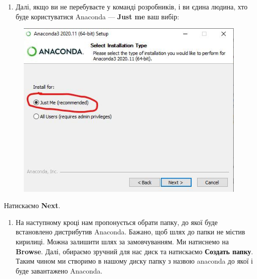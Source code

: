 \documentclass[
  letterpaper,
]{report}
\providecommand{\tightlist}{%
  \setlength{\itemsep}{0pt}\setlength{\parskip}{0pt}}\usepackage{longtable,booktabs,array}
\begin{document}
\begin{enumerate}
\def\labelenumi{\arabic{enumi}.}
\setcounter{enumi}{6}
\tightlist
\item
  Далі, якщо ви не перебуваєте у команді розробників, і ви єдина людина,
  хто буде користуватися Anaconda --- \textbf{Just me} ваш вибір:
\end{enumerate}

\begin{figure}

{\centering \includegraphics{Images/ap1/Screenshot_8.jpg}

}

\end{figure}

Натискаємо \textbf{Next}.

\begin{enumerate}
\def\labelenumi{\arabic{enumi}.}
\setcounter{enumi}{7}
\tightlist
\item
  На наступному кроці нам пропонується обрати папку, до якої буде
  встановлено дистрибутив Anaconda. Бажано, щоб шлях до папки не містив
  кирилиці. Можна залишити шлях за замовчуванням. Ми натиснемо на
  \textbf{Browse}. Далі, обираємо зручний для нас диск та натискаємо
  \textbf{Создать папку}. Таким чином ми створимо в нашому диску папку з
  назвою anaconda до якої і буде завантажено Anaconda.
\end{enumerate}
\end{document}
